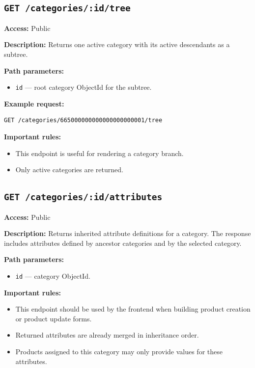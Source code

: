 \subsection{\texttt{GET /categories/:id/tree}}

\textbf{Access:} Public

\textbf{Description:} Returns one active category with its active descendants as a subtree.

\textbf{Path parameters:}

\begin{itemize}
    \item \texttt{id} --- root category ObjectId for the subtree.
\end{itemize}

\textbf{Example request:}

\begin{verbatim}
GET /categories/665000000000000000000001/tree
\end{verbatim}

\textbf{Important rules:}

\begin{itemize}
    \item This endpoint is useful for rendering a category branch.
    \item Only active categories are returned.
\end{itemize}

\subsection{\texttt{GET /categories/:id/attributes}}

\textbf{Access:} Public

\textbf{Description:} Returns inherited attribute definitions for a category. The response includes attributes defined by ancestor categories and by the selected category.

\textbf{Path parameters:}

\begin{itemize}
    \item \texttt{id} --- category ObjectId.
\end{itemize}

\textbf{Important rules:}

\begin{itemize}
    \item This endpoint should be used by the frontend when building product creation or product update forms.
    \item Returned attributes are already merged in inheritance order.
    \item Products assigned to this category may only provide values for these attributes.
\end{itemize}

